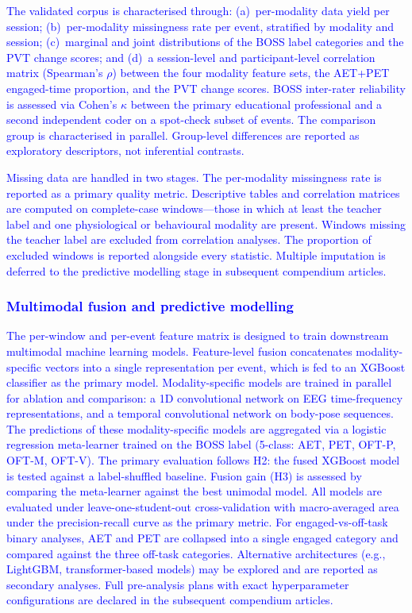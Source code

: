 \textcolor{blue}{The validated corpus is characterised through: (a)~per-modality data yield per session; (b)~per-modality missingness rate per event, stratified by modality and session; (c)~marginal and joint distributions of the BOSS label categories and the PVT change scores; and (d)~a session-level and participant-level correlation matrix (Spearman's $\rho$) between the four modality feature sets, the AET+PET engaged-time proportion, and the PVT change scores. BOSS inter-rater reliability is assessed via Cohen's $\kappa$ between the primary educational professional and a second independent coder on a spot-check subset of events. The comparison group is characterised in parallel. Group-level differences are reported as exploratory descriptors, not inferential contrasts.}

\textcolor{blue}{Missing data are handled in two stages. The per-modality missingness rate is reported as a primary quality metric. Descriptive tables and correlation matrices are computed on complete-case windows---those in which at least the teacher label and one physiological or behavioural modality are present. Windows missing the teacher label are excluded from correlation analyses. The proportion of excluded windows is reported alongside every statistic. Multiple imputation is deferred to the predictive modelling stage in subsequent compendium articles.}

\textcolor{blue}{\subsubsection{Multimodal fusion and predictive modelling}}

\textcolor{blue}{The per-window and per-event feature matrix is designed to train downstream multimodal machine learning models. Feature-level fusion concatenates modality-specific vectors into a single representation per event, which is fed to an XGBoost classifier as the primary model. Modality-specific models are trained in parallel for ablation and comparison: a 1D convolutional network on EEG time-frequency representations, and a temporal convolutional network on body-pose sequences. The predictions of these modality-specific models are aggregated via a logistic regression meta-learner trained on the BOSS label (5-class: AET, PET, OFT-P, OFT-M, OFT-V). The primary evaluation follows H2: the fused XGBoost model is tested against a label-shuffled baseline. Fusion gain (H3) is assessed by comparing the meta-learner against the best unimodal model. All models are evaluated under leave-one-student-out cross-validation with macro-averaged area under the precision-recall curve as the primary metric. For engaged-vs-off-task binary analyses, AET and PET are collapsed into a single engaged category and compared against the three off-task categories. Alternative architectures (e.g., LightGBM, transformer-based models) may be explored and are reported as secondary analyses. Full pre-analysis plans with exact hyperparameter configurations are declared in the subsequent compendium articles.}

